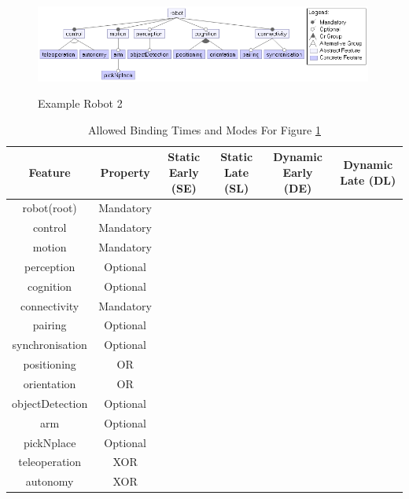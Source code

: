 \documentclass{article}
\newcommand{\xmark}{\ding{55}}%
\begin{document}
\begin{figure}[H]
	\caption{Example Robot 2}
	\centering
	\includegraphics[width=0.99\textwidth]{images/robo2.png}
	\label{robo2}
\end{figure}

\begin{table}[H]
	\caption{Allowed Binding Times and Modes For Figure \ref{robo2}}
	\centering
	\begin{center}
		\begin{tabular}{c c c c c c}
			\hline
			Feature & Property & Static Early (SE) & Static Late (SL) & Dynamic Early (DE) & Dynamic Late (DL) \\\hline
			robot(root) & Mandatory & \checkmark & \xmark & \xmark & \xmark \\ \hline
			control & Mandatory & \checkmark & \checkmark & \xmark & \xmark \\ \hline
			motion & Mandatory & \checkmark & \checkmark & \xmark & \xmark \\ \hline
			perception & Optional & \checkmark & \xmark & \xmark & \xmark \\ \hline
			cognition & Optional & \checkmark & \xmark & \xmark & \xmark \\ \hline
			connectivity & Mandatory & \checkmark & \checkmark & \xmark & \xmark \\ \hline
			pairing & Optional & \xmark & \xmark & \checkmark & \checkmark \\ \hline
			synchronisation & Optional & \xmark & \xmark & \checkmark & \checkmark \\ \hline
			positioning & OR & \checkmark & \checkmark & \checkmark & \checkmark \\ \hline
			orientation & OR & \checkmark & \checkmark & \checkmark & \checkmark \\ \hline
			objectDetection & Optional & \xmark & \xmark & \checkmark & \checkmark \\ \hline
			arm & Optional & \xmark & \xmark & \checkmark & \checkmark \\ \hline
			pickNplace & Optional & \xmark & \xmark & \checkmark & \checkmark \\ \hline
			teleoperation & XOR & \xmark & \xmark & \checkmark & \checkmark \\ \hline
			autonomy & XOR & \xmark & \xmark & \checkmark & \checkmark \\ \hline
		\end{tabular}
		\label{tab:tabr2}
	\end{center}
\end{table}
\end{document}
